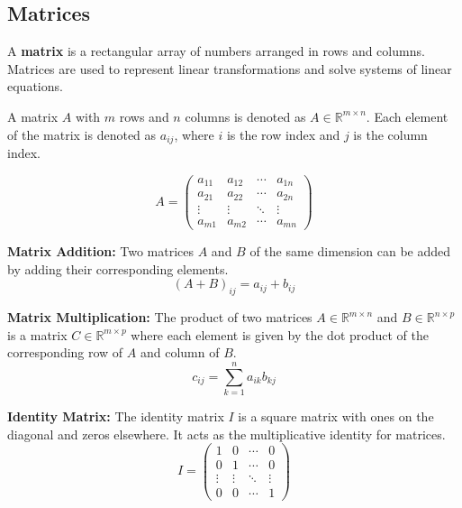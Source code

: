 \documentclass[11pt, draft]{article}
\begin{document}
\subsection{Matrices}
A \textbf{matrix} is a rectangular array of numbers arranged in rows and
columns. Matrices are used to represent linear transformations and solve
systems of linear equations.

\begin{definition}
	A matrix \(A\) with \(m\) rows and \(n\) columns is denoted as \(A \in \mathbb{R}^{m \times n}\). Each element of the matrix is denoted as \(a_{ij}\), where \(i\) is the row index and \(j\) is the column index.
\end{definition}

\begin{equation}
	A = \begin{pmatrix}
		a_{11} & a_{12} & \cdots & a_{1n} \\
		a_{21} & a_{22} & \cdots & a_{2n} \\
		\vdots & \vdots & \ddots & \vdots \\
		a_{m1} & a_{m2} & \cdots & a_{mn}
	\end{pmatrix}
\end{equation}

\textbf{Matrix Addition:} Two matrices \(A\) and \(B\) of the same dimension can be added by adding their corresponding elements.
\begin{equation}
	(A + B)_{ij} = a_{ij} + b_{ij}
\end{equation}

\textbf{Matrix Multiplication:} The product of two matrices \(A \in \mathbb{R}^{m \times n}\) and \(B \in \mathbb{R}^{n \times p}\) is a matrix \(C \in \mathbb{R}^{m \times p}\) where each element is given by the dot product of the corresponding row of \(A\) and column of \(B\).
\begin{equation}
	c_{ij} = \sum_{k=1}^{n} a_{ik} b_{kj}
\end{equation}

\textbf{Identity Matrix:} The identity matrix \(I\) is a square matrix with ones on the diagonal and zeros elsewhere. It acts as the multiplicative identity for matrices.
\begin{equation}
	I = \begin{pmatrix}
		1      & 0      & \cdots & 0      \\
		0      & 1      & \cdots & 0      \\
		\vdots & \vdots & \ddots & \vdots \\
		0      & 0      & \cdots & 1
	\end{pmatrix}
\end{equation}
\end{document}
